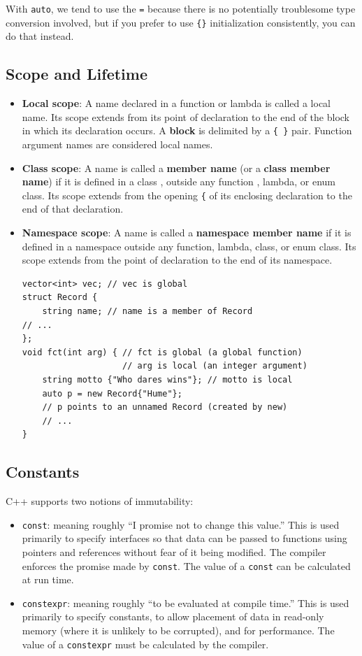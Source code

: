 \documentclass[11pt]{article}
\begin{document}
With \texttt{auto}, we tend to use the \texttt{=} because there is no potentially troublesome type conversion
involved, but if you prefer to use \texttt{\{\}} initialization consistently, you can do that instead.
\subsection{Scope and Lifetime}
\label{sec:orgc46f4a9}
\begin{itemize}
\item \textbf{Local scope}: A name declared in a function or lambda is called a local name.
Its scope extends from its point of declaration to the end of the block in which its
declaration occurs. A \textbf{block} is delimited by a \texttt{\{ \}} pair. Function argument names are
considered local names.
\item \textbf{Class scope}: A name is called a \textbf{member name} (or a \textbf{class member name}) if it is defined in a
class , outside any function , lambda, or enum class. Its scope extends from the opening \texttt{\{} of
its enclosing declaration to the end of that declaration.
\item \textbf{Namespace scope}: A name is called a \textbf{namespace member name} if it is defined in a namespace
outside any function, lambda, class, or enum class. Its scope extends from the point of
declaration to the end of its namespace.

\begin{verbatim}
vector<int> vec; // vec is global 
struct Record {  
    string name; // name is a member of Record 
// ...
};
void fct(int arg) { // fct is global (a global function)
                    // arg is local (an integer argument)
    string motto {"Who dares wins"}; // motto is local
    auto p = new Record{"Hume"};
    // p points to an unnamed Record (created by new)
    // ...
}
\end{verbatim}
\end{itemize}
\subsection{Constants}
\label{sec:orgf9348e7}
C++ supports two notions of immutability:
\begin{itemize}
\item \texttt{const}: meaning roughly ``I promise not to change this value.'' This is used primarily to
specify interfaces so that data can be passed to functions using pointers and references without
fear of it being modified. The compiler enforces the promise made by \texttt{const}. The value of a \texttt{const} can
be calculated at run time.
\item \texttt{constexpr}: meaning roughly ``to be evaluated at compile time.'' This is used primarily to
specify constants, to allow placement of data in read-only memory (where it is unlikely to
be corrupted), and for performance. The value of a \texttt{constexpr} must be calculated by the
compiler.
\end{itemize}
\end{document}
